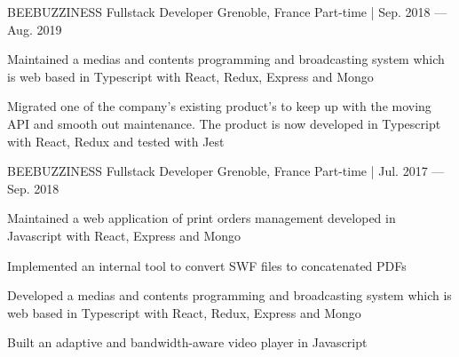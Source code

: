 

\begin{cventries}

  \cventry
  	{BEEBUZZINESS} %
    {Fullstack Developer} %
    {Grenoble, France} %
    {Part-time | Sep. 2018 — Aug. 2019} %
    {
      \begin{cvitems} %
        \item {Maintained a medias and contents programming and broadcasting system which is web based in Typescript with React, Redux, Express and Mongo}
        \item {Migrated one of the company's existing product's to keep up with the moving API and smooth out maintenance. The product is now developed in Typescript with React, Redux and tested with Jest}
      \end{cvitems}
    }

  \cventry
  	{BEEBUZZINESS} %
    {Fullstack Developer} %
    {Grenoble, France} %
    {Part-time | Jul. 2017 — Sep. 2018} %
    {
      \begin{cvitems} %
        \item {Maintained a web application of print orders management developed in Javascript with React, Express and Mongo}
        \item {Implemented an internal tool to convert SWF files to concatenated PDFs}
        \item {Developed a medias and contents programming and broadcasting system which is web based in Typescript with React, Redux, Express and Mongo}
        \item {Built an adaptive and bandwidth-aware video player in Javascript}
      \end{cvitems}
    }


\end{cventries}
